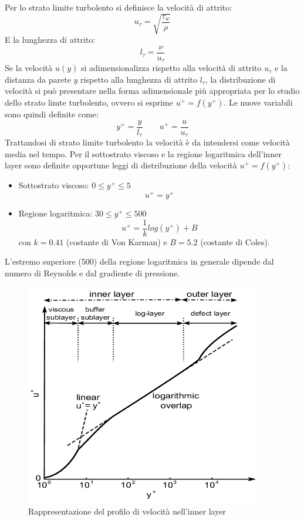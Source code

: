 \noindent Per lo strato limite turbolento si definisce la velocità di attrito:
\begin{equation*}
    u_\tau = \sqrt{\frac{\tau_w}{\rho}}
\end{equation*}
E la lunghezza di attrito:
\begin{equation*}
    l_\tau = \frac{\nu}{u_\tau}
\end{equation*}
Se la velocità $u(y)$ si adimensionalizza rispetto alla velocità di attrito $u_\tau$ e la distanza da parete $y$ rispetto alla lunghezza di attrito $l_\tau$, la distribuzione di velocità si può presentare nella forma adimensionale più appropriata per lo studio dello strato limte turbolento, ovvero si esprime $u^+ = f(y^+)$. Le nuove variabili sono quindi definite come:
\begin{equation*}
    y^+ = \frac{y}{l_\tau} \qquad u^+ = \frac{u}{u_\tau}
\end{equation*}
Trattandosi di strato limite turbolento la velocità è da intendersi come velocità media nel tempo. Per il sottostrato viscoso e la regione logaritmica dell'inner layer sono definite opportune leggi di distribuzione della velocità $u^+=f(y^+)$:
\begin{itemize}
    \item Sottostrato viscoso: $0 \le y^+ \le 5$
    \begin{equation*}
        u^+ = y^+
    \end{equation*}
    \item Regione logaritmica: $30 \le y^+ \le 500$
    \begin{equation*}
        u^+ = \frac{1}{k}log(y^+) + B
    \end{equation*}
    con $k = 0.41$ (costante di Von Karman) e $B = 5.2$ (costante di Coles).
\end{itemize}

\noindent L'estremo superiore (500) della regione logaritmica in generale dipende dal numero di Reynolds e dal gradiente di pressione.
\begin{figure}[H]
    \centering
    \includegraphics[width=.55\textwidth]{images/9/slinnerimage.png}
    \caption{Rappresentazione del profilo di velocità nell'inner layer}
\end{figure}

